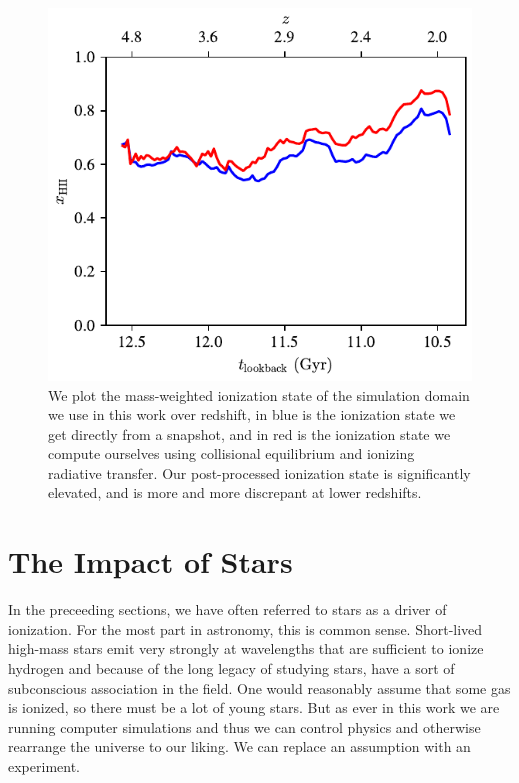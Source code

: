 \begin{figure}
    \centering
    \includegraphics[width=\textwidth,keepaspectratio]{figures/ionization_state.pdf}
    \caption{
        We plot the mass-weighted ionization state of the simulation domain we use in this work over redshift, in blue is the ionization state we get directly from a snapshot, and in red is the ionization state we compute ourselves using collisional equilibrium and ionizing radiative transfer.
        Our post-processed ionization state is significantly elevated, and is more and more discrepant at lower redshifts.
    }
    \label{fig:pre_post_ionization}
\end{figure}


\section{The Impact of Stars}

In the preceeding sections, we have often referred to stars as a driver of ionization.
For the most part in astronomy, this is common sense.
Short-lived high-mass stars emit very strongly at wavelengths that are sufficient to ionize hydrogen and because of the long legacy of studying stars, have a sort of subconscious association in the field.
One would reasonably assume that some gas is ionized, so there must be a lot of young stars.
But as ever in this work we are running computer simulations and thus we can control physics and otherwise rearrange the universe to our liking.
We can replace an assumption with an experiment.

